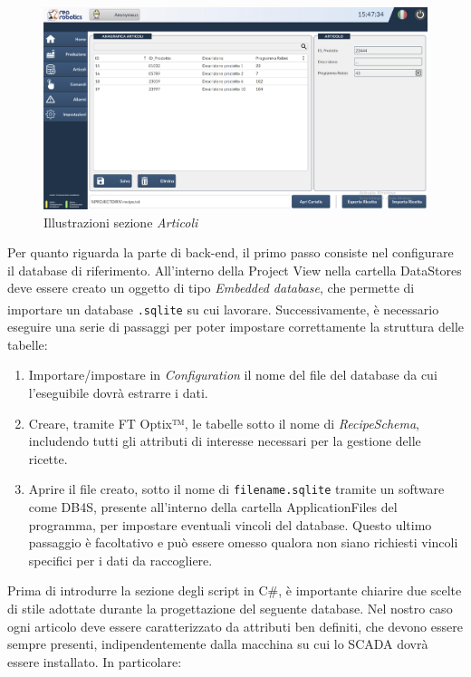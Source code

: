 \begin{figure} 
    \centering
    \includegraphics[width=1\linewidth]{Immagini/AnagraficaArticoli.png}
    \caption{Illustrazioni sezione \textit{Articoli}}
    \label{fig:AnagraficaArticoli.png}
\end{figure}

Per quanto riguarda la parte di back-end, il primo passo consiste nel configurare il database di riferimento. All'interno della Project View nella cartella DataStores deve essere creato un oggetto di tipo \textit{Embedded database}, che permette di importare un database \verb|.sqlite| su cui lavorare\textsuperscript{\cite{rockwelloptixdatastore}}. Successivamente, è necessario eseguire una serie di passaggi per poter impostare correttamente la struttura delle tabelle:

\begin{enumerate}
    \item Importare/impostare in \textit{Configuration} il nome del file del database da cui l'eseguibile dovrà estrarre i dati.
    \item Creare, tramite FT Optix™, le tabelle sotto il nome di \textit{RecipeSchema}, includendo tutti gli attributi di interesse necessari per la gestione delle ricette.
    \item Aprire il file creato, sotto il nome di \verb|filename.sqlite| tramite un software come DB4S, presente all'interno della cartella ApplicationFiles del programma, per impostare eventuali vincoli del database. Questo ultimo passaggio è facoltativo e può essere omesso qualora non siano richiesti vincoli specifici per i dati da raccogliere.
\end{enumerate} 

Prima di introdurre la sezione degli script in C\#, è importante chiarire due scelte di stile adottate durante la progettazione del seguente database. Nel nostro caso ogni articolo deve essere caratterizzato da attributi ben definiti, che devono essere sempre presenti, indipendentemente dalla macchina su cui lo SCADA dovrà essere installato. In particolare:

